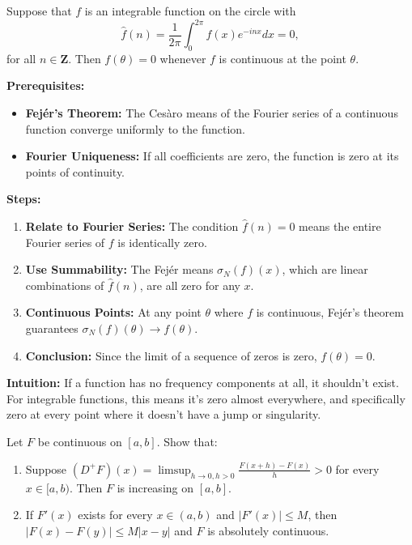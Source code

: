 \begin{exercise}
\label{analysis:2017:7}
Suppose that $f$ is an integrable function on the circle with 
\[
\hat{f}(n) = \frac{1}{2\pi} \int_0^{2\pi} f(x) e^{-inx} dx = 0,
\]
for all $n \in \mathbf{Z}$. Then $f(\theta) = 0$ whenever $f$ is continuous at the point $\theta$.
\end{exercise}

\begin{solution}
\textbf{Prerequisites:}
\begin{itemize}
    \item \textbf{Fejér's Theorem:} The Cesàro means of the Fourier series of a continuous function converge uniformly to the function.
    \item \textbf{Fourier Uniqueness:} If all coefficients are zero, the function is zero at its points of continuity.
\end{itemize}

\textbf{Steps:}
\begin{enumerate}
    \item \textbf{Relate to Fourier Series:} The condition $\hat{f}(n)=0$ means the entire Fourier series of $f$ is identically zero.
    \item \textbf{Use Summability:} The Fejér means $\sigma_N(f)(x)$, which are linear combinations of $\hat{f}(n)$, are all zero for any $x$.
    \item \textbf{Continuous Points:} At any point $\theta$ where $f$ is continuous, Fejér's theorem guarantees $\sigma_N(f)(\theta) \to f(\theta)$.
    \item \textbf{Conclusion:} Since the limit of a sequence of zeros is zero, $f(\theta) = 0$.
\end{enumerate}

\textbf{Intuition:}
If a function has no frequency components at all, it shouldn't exist. For integrable functions, this means it's zero almost everywhere, and specifically zero at every point where it doesn't have a jump or singularity.
\end{solution}

\begin{exercise}
\label{analysis:2017:8}
Let $F$ be continuous on $[a, b]$. Show that:
\begin{enumerate}
    \item Suppose $(D^+ F)(x) = \limsup_{h \to 0, h > 0} \frac{F(x+h) - F(x)}{h} > 0$ for every $x \in [a, b)$. Then $F$ is increasing on $[a, b]$.
    \item If $F'(x)$ exists for every $x \in (a, b)$ and $|F'(x)| \leq M$, then $|F(x) - F(y)| \leq M|x-y|$ and $F$ is absolutely continuous.
\end{enumerate}
\end{exercise}

